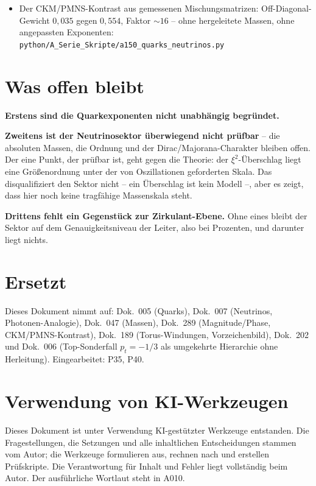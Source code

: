 \begin{itemize}
  \item Der CKM/PMNS-Kontrast aus gemessenen Mischungsmatrizen: Off-Diagonal-Gewicht
    $0{,}035$ gegen $0{,}554$, Faktor $\sim16$ -- ohne hergeleitete Massen, ohne
    angepassten Exponenten:
    \texttt{python/A\_Serie\_Skripte/a150\_quarks\_neutrinos.py}
\end{itemize}

\section{Was offen bleibt}

\textbf{Erstens sind die Quarkexponenten nicht unabhängig begründet.}

\textbf{Zweitens ist der Neutrinosektor überwiegend nicht prüfbar} -- die
absoluten Massen, die Ordnung und der Dirac/Majorana-Charakter bleiben offen.
Der eine Punkt, der prüfbar ist, geht gegen die Theorie: der
$\xi^2$-Überschlag liegt eine Größenordnung unter der von Oszillationen
geforderten Skala. Das disqualifiziert den Sektor nicht -- ein Überschlag ist
kein Modell --, aber es zeigt, dass hier noch keine tragfähige Massenskala
steht.

\textbf{Drittens fehlt ein Gegenstück zur Zirkulant-Ebene.} Ohne eines bleibt
der Sektor auf dem Genauigkeitsniveau der Leiter, also bei Prozenten, und
darunter liegt nichts.

\section{Ersetzt}

Dieses Dokument nimmt auf: Dok.~005 (Quarks), Dok.~007 (Neutrinos, Photonen-Analogie), Dok.~047 (Massen), Dok.~289 (Magnitude/Phase, CKM/PMNS-Kontrast), Dok.~189 (Torus-Windungen, Vorzeichenbild), Dok.~202 und Dok.~006 (Top-Sonderfall $p_t=-1/3$ als umgekehrte Hierarchie ohne Herleitung). Eingearbeitet: P35, P40.

\section{Verwendung von KI-Werkzeugen}

Dieses Dokument ist unter Verwendung KI-gestützter Werkzeuge entstanden. Die
Fragestellungen, die Setzungen und alle inhaltlichen Entscheidungen stammen vom
Autor; die Werkzeuge formulieren aus, rechnen nach und erstellen Prüfskripte.
Die Verantwortung für Inhalt und Fehler liegt vollständig beim Autor. Der
ausführliche Wortlaut steht in A010.
